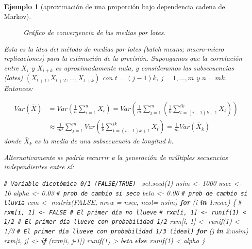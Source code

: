 \documentclass[
]{book}
\newenvironment{Shaded}{\begin{snugshade}}{\end{snugshade}}
\newcommand{\AttributeTok}[1]{\textcolor[rgb]{0.77,0.63,0.00}{#1}}
\newcommand{\CommentTok}[1]{\textcolor[rgb]{0.56,0.35,0.01}{\textit{#1}}}
\newcommand{\ConstantTok}[1]{\textcolor[rgb]{0.00,0.00,0.00}{#1}}
\newcommand{\ControlFlowTok}[1]{\textcolor[rgb]{0.13,0.29,0.53}{\textbf{#1}}}
\newcommand{\DecValTok}[1]{\textcolor[rgb]{0.00,0.00,0.81}{#1}}
\newcommand{\FloatTok}[1]{\textcolor[rgb]{0.00,0.00,0.81}{#1}}
\newcommand{\FunctionTok}[1]{\textcolor[rgb]{0.00,0.00,0.00}{#1}}
\newcommand{\NormalTok}[1]{#1}
\newcommand{\OtherTok}[1]{\textcolor[rgb]{0.56,0.35,0.01}{#1}}
\newcommand{\SpecialCharTok}[1]{\textcolor[rgb]{0.00,0.00,0.00}{#1}}
\theoremstyle{break}
\newtheorem{example}{Ejemplo}[chapter]
\theoremstyle{nonumberplain}
\renewcommand{\CommentTok}[1]{\textcolor[rgb]{0.41,0.41,0.41}{\texttt{#1}}}
\begin{document}
\begin{example}[aproximación de una proporción bajo dependencia cadena de Markov]
\begin{figure}[!htb]
\caption{Gráfico de convergencia de las medias por lotes.}\label{fig:conv-dep-lotes}
\end{figure}

Esta es la idea del método de medias por lotes (\emph{batch means}; \emph{macro-micro replicaciones}) para la estimación de la precisión.
Supongamos que la correlación entre \(X_i\) y \(X_{i+k}\) es aproximadamente nula, y consideramos las subsecuencias (lotes) \((X_{t+1},X_{t+2},\ldots,X_{t+k})\) con \(t=(j-1)k\), \(j=1,\ldots,m\) y \(n = mk\).
Entonces:

\[\begin{aligned}
Var \left(\bar X \right) &= Var \left(\frac{1}{n} \sum_{i=1}^n X_i\right) 
= Var \left( \frac{1}{m}\sum_{j=1}^m \left(\frac{1}{k} \sum_{t=(i-1)k + 1}^{ik} X_t\right) \right) \\
&\approx \frac{1}{m^2} \sum_{j=1}^m Var \left(\frac{1}{k} \sum_{t=(i-1)k + 1}^{ik} X_t\right)
= \frac{1}{m} Var \left(\bar{X}_k \right)
\end{aligned}\]
donde \(\bar{X}_k\) es la media de una subsecuencia de longitud \(k\).

Alternativamente se podría recurrir a la generación de múltiples secuencias independientes entre sí:

\begin{Shaded}
\begin{Highlighting}[]
\CommentTok{\# Variable dicotómica 0/1 (FALSE/TRUE)  }
\FunctionTok{set.seed}\NormalTok{(}\DecValTok{1}\NormalTok{)}
\NormalTok{nsim }\OtherTok{\textless{}{-}} \DecValTok{1000}
\NormalTok{nsec }\OtherTok{\textless{}{-}} \DecValTok{10}
\NormalTok{alpha }\OtherTok{\textless{}{-}} \FloatTok{0.03} \CommentTok{\# prob de cambio si seco}
\NormalTok{beta }\OtherTok{\textless{}{-}} \FloatTok{0.06}  \CommentTok{\# prob de cambio si lluvia}
\NormalTok{rxm }\OtherTok{\textless{}{-}} \FunctionTok{matrix}\NormalTok{(}\ConstantTok{FALSE}\NormalTok{, }\AttributeTok{nrow =}\NormalTok{ nsec, }\AttributeTok{ncol=}\NormalTok{ nsim)}
\ControlFlowTok{for}\NormalTok{ (i }\ControlFlowTok{in} \DecValTok{1}\SpecialCharTok{:}\NormalTok{nsec) \{}
  \CommentTok{\# rxm[i, 1] \textless{}{-} FALSE \# El primer día no llueve}
  \CommentTok{\# rxm[i, 1] \textless{}{-} runif(1) \textless{} 1/2 \# El primer día llueve con probabilidad 1/2}
\NormalTok{  rxm[i, }\DecValTok{1}\NormalTok{] }\OtherTok{\textless{}{-}} \FunctionTok{runif}\NormalTok{(}\DecValTok{1}\NormalTok{) }\SpecialCharTok{\textless{}} \DecValTok{1}\SpecialCharTok{/}\DecValTok{3} \CommentTok{\# El primer día llueve con probabilidad 1/3 (ideal)}
  \ControlFlowTok{for}\NormalTok{ (j }\ControlFlowTok{in} \DecValTok{2}\SpecialCharTok{:}\NormalTok{nsim)}
\NormalTok{    rxm[i, j] }\OtherTok{\textless{}{-}} \ControlFlowTok{if}\NormalTok{ (rxm[i, j}\DecValTok{{-}1}\NormalTok{]) }\FunctionTok{runif}\NormalTok{(}\DecValTok{1}\NormalTok{) }\SpecialCharTok{\textgreater{}}\NormalTok{ beta }\ControlFlowTok{else} \FunctionTok{runif}\NormalTok{(}\DecValTok{1}\NormalTok{) }\SpecialCharTok{\textless{}}\NormalTok{ alpha}
\NormalTok{\}}
\end{Highlighting}
\end{Shaded}


\end{example}
\end{document}
